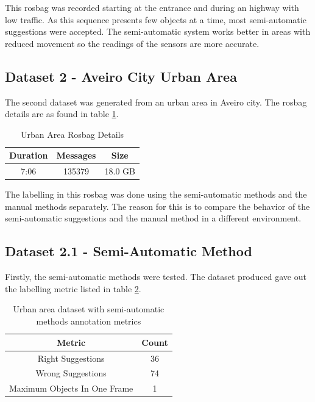 This rosbag was recorded starting at the entrance and during an highway with low traffic. As this sequence presents few objects at a time, most semi-automatic suggestions were accepted. The semi-automatic system works better in areas with reduced movement so the readings of the sensors are more accurate.

\subsection{Dataset 2 - Aveiro City Urban Area}

The second dataset was generated from an urban area in Aveiro city. The rosbag details are as found in table \ref{tab: urbanrosbag}.

\begin{table}[]
	\centering
	\caption{Urban Area Rosbag Details}
	\label{tab: urbanrosbag}
	\begin{tabular}{c|c|c}
		\textbf{Duration} & \textbf{Messages} & \textbf{Size} \\ \hline
		7:06              & 135379            & 18.0 GB      
	\end{tabular}
\end{table}

The labelling in this rosbag was done using the semi-automatic methods and the manual methods separately. The reason for this is to compare the behavior of the semi-automatic suggestions and the manual method in a different environment.

\subsection{Dataset 2.1 - Semi-Automatic Method}

Firstly, the semi-automatic methods were tested. The dataset produced gave out the labelling metric listed in table \ref{tab: urban1metrics}.

\begin{table}[]
	\centering
	\caption{Urban area dataset with semi-automatic methods annotation metrics}
	\label{tab: urban1metrics}
	\begin{tabular}{c|c}
		\textbf{Metric}              & \textbf{Count} \\ \hline
		Right Suggestions            & 36                      \\ \hline
		Wrong Suggestions            & 74                      \\ \hline
		Maximum Objects In One Frame & 1                      
	\end{tabular}
\end{table}

